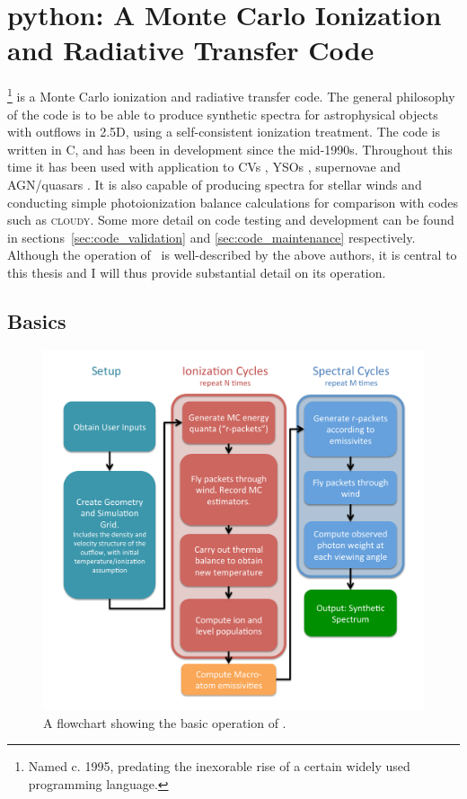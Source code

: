
\section{{\sc python}: A Monte Carlo Ionization and Radiative Transfer Code}
\label{sec:python}

\py\footnote{Named c. 1995, predating the inexorable rise of a certain widely used
programming language.} is a Monte Carlo ionization and radiative transfer code. 
The general philosophy of the code is to be able to produce synthetic spectra
for astrophysical objects with outflows in 2.5D, using a self-consistent ionization 
treatment. The code is written in C, and has been in development since the mid-1990s.
Throughout this time it has been used with application to CVs \citep[hereafter LK02]{LK02},
YSOs \citep[][hereafter SDL05]{simmacro2005}, supernovae \citep{kerzendorfsim} and AGN/quasars 
\citep[hereafter H13 and H14]{higginbottom2013,H14}. It is also capable of producing spectra 
for stellar winds and conducting simple photoionization balance calculations for
comparison with codes such as \textsc{cloudy}. Some more detail on code testing and 
development can be found in sections~\ref{sec:code_validation} and \ref{sec:code_maintenance}
respectively. Although the operation of \py\ is well-described by the above authors,
it is central to this thesis and I will thus provide substantial detail on its operation. 

\subsection{Basics}

\begin{figure}
\centering
\includegraphics[width=1.0\textwidth]{figures/03-radtrans/flowchart.pdf}
\caption
{
A flowchart showing the basic operation of \py.
} 
\label{fig:flowchart}
\end{figure}

